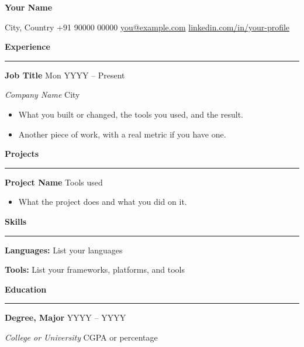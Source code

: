 \documentclass[11pt,a4paper]{article}
\newcommand{\resumesection}[1]{%
  \vspace{10pt}
  {\large\bfseries #1 \par}
  \vspace{2pt}\hrule\vspace{5pt}
}
\newcommand{\resumeentry}[4]{%
  \textbf{#1} \hfill #2 \par
  \textit{#3} \hfill #4 \par
}
\newenvironment{resumeitems}
  {\begin{itemize}\setlength{\itemsep}{1pt}\setlength{\parsep}{0pt}}
  {\end{itemize}}
\begin{document}
\begin{center}
  {\LARGE\bfseries Your Name} \par\vspace{3pt}
  City, Country \textbar{} +91 90000 00000 \textbar{}
  \href{mailto:you@example.com}{you@example.com} \textbar{}
  \href{https://www.linkedin.com/in/your-profile}{linkedin.com/in/your-profile}
\end{center}

\resumesection{Experience}

\resumeentry{Job Title}{Mon YYYY -- Present}{Company Name}{City}
\begin{resumeitems}
  \item What you built or changed, the tools you used, and the result.
  \item Another piece of work, with a real metric if you have one.
\end{resumeitems}

\resumesection{Projects}

\textbf{Project Name} \textbar{} Tools used \par
\begin{resumeitems}
  \item What the project does and what you did on it.
\end{resumeitems}

\resumesection{Skills}

\textbf{Languages:} List your languages \par
\textbf{Tools:} List your frameworks, platforms, and tools \par

\resumesection{Education}

\resumeentry{Degree, Major}{YYYY -- YYYY}{College or University}{CGPA or percentage}
\end{document}
